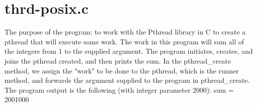 \documentclass[12pt]{article}
\begin{document}
\section{thrd-posix.c}
The purpose of the program: to work with the Pthread library in C to create a pthread that will execute some work. The work in this program will sum all of the integers from 1 to the supplied argument. The program initiates, creates, and joins the pthread created, and then prints the sum. In the pthread\_create method, we assign the "work" to be done to the pthread, which is the runner method, and forwards the argument supplied to the program in pthread\_create. The program output is the following (with integer parameter 2000):
{\color{blue}
\newline sum = 2001000
}
\end{document}
